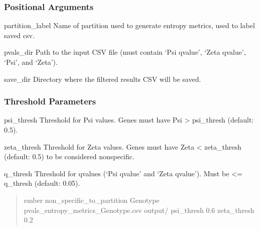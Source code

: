 \documentclass[letterpaper,10pt,english]{sphinxmanual}
\begin{document}
\subsubsection{Positional Arguments}
\label{\detokenize{cli:positional-arguments_repeat8}}\begin{optionlist}{3cm}
\item [partition\_label]  
\sphinxAtStartPar
Name of partition used to generate entropy metrics, used to label saved csv.
\item [pvals\_dir]  
\sphinxAtStartPar
Path to the input CSV file (must contain ‘Psi q\sphinxhyphen{}value’, ‘Zeta q\sphinxhyphen{}value’, ‘Psi’, and ‘Zeta’).
\item [save\_dir]  
\sphinxAtStartPar
Directory where the filtered results CSV will be saved.
\end{optionlist}


\subsubsection{Threshold Parameters}
\label{\detokenize{cli:threshold-parameters_repeat2}}\begin{optionlist}{3cm}
\item [\sphinxhyphen{}\sphinxhyphen{}psi\_thresh]  
\sphinxAtStartPar
Threshold for Psi values. Genes must have Psi \textgreater{} psi\_thresh (default: 0.5).
\item [\sphinxhyphen{}\sphinxhyphen{}zeta\_thresh]  
\sphinxAtStartPar
Threshold for Zeta values. Genes must have Zeta \textless{} zeta\_thresh (default: 0.5) to be considered non\sphinxhyphen{}specific.
\item [\sphinxhyphen{}\sphinxhyphen{}q\_thresh]  
\sphinxAtStartPar
Threshold for q\sphinxhyphen{}values (‘Psi q\sphinxhyphen{}value’ and ‘Zeta q\sphinxhyphen{}value’). Must be \textless{}= q\_thresh (default: 0.05).
\end{optionlist}
\begin{quote}
\begin{description}
\sphinxAtStartPar
ember non\_specific\_to\_partition Genotype pvals\_entropy\_metrics\_Genotype.csv output/ \textendash{}psi\_thresh 0.6 \textendash{}zeta\_thresh 0.2

\end{description}
\end{quote}
\end{document}
